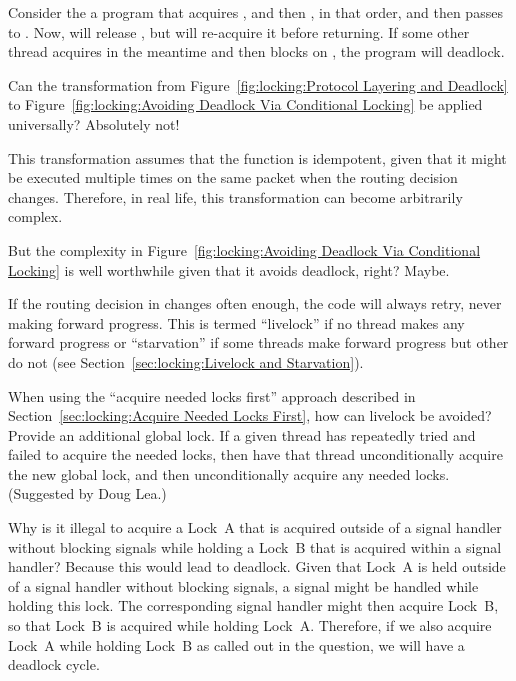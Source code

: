 	Consider the a program that acquires , and then
	, in that order, and then passes 
	to .
	Now,  will release , but
	will re-acquire it before returning.
	If some other thread acquires  in the meantime
	and then blocks on , the program will deadlock.

\QuickQ{}
	Can the transformation from
	Figure~\ref{fig:locking:Protocol Layering and Deadlock} to
	Figure~\ref{fig:locking:Avoiding Deadlock Via Conditional Locking}
	be applied universally?
\QuickA{}
	Absolutely not!

	This transformation assumes that the
	 function is idempotent, given that
	it might be executed multiple times on the same packet when
	the  routing decision changes.
	Therefore, in real life, this transformation can become
	arbitrarily complex.

\QuickQ{}
	But the complexity in
	Figure~\ref{fig:locking:Avoiding Deadlock Via Conditional Locking}
	is well worthwhile given that it avoids deadlock, right?
\QuickA{}
	Maybe.

	If the routing decision in  changes often enough,
	the code will always retry, never making forward progress.
	This is termed ``livelock'' if no thread makes any forward progress or
	``starvation''
	if some threads make forward progress but other do not
	(see Section~\ref{sec:locking:Livelock and Starvation}).

\QuickQ{}
	When using the ``acquire needed locks first'' approach described in
	Section~\ref{sec:locking:Acquire Needed Locks First},
	how can livelock be avoided?
\QuickA{}
	Provide an additional global lock.
	If a given thread has repeatedly tried and failed to acquire the needed
	locks, then have that thread unconditionally acquire the new
	global lock, and then unconditionally acquire any needed locks.
	(Suggested by Doug Lea.)

\QuickQ{}
	Why is it illegal to acquire a Lock~A that is acquired outside
	of a signal handler without blocking signals while holding
	a Lock~B that is acquired within a signal handler?
\QuickA{}
	Because this would lead to deadlock.
	Given that Lock~A is held outside of a signal
	handler without blocking signals, a signal might be handled while
	holding this lock.
	The corresponding signal handler might then acquire
	Lock~B, so that Lock~B is acquired while holding Lock~A.
	Therefore, if we also acquire Lock~A while holding Lock~B
	as called out in the question, we will have a deadlock cycle.

